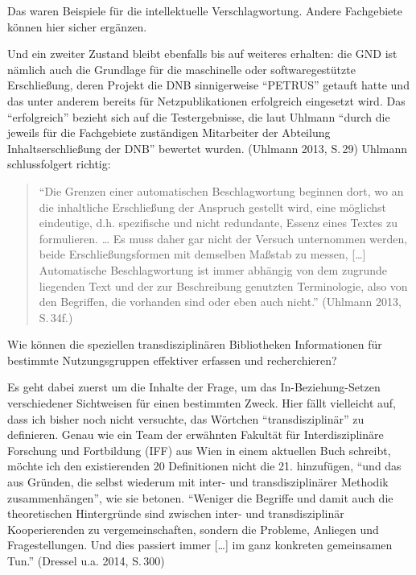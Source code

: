 Das waren Beispiele für die intellektuelle Verschlagwortung. Andere
Fachgebiete können hier sicher ergänzen.

Und ein zweiter Zustand bleibt ebenfalls bis auf weiteres erhalten: die
GND ist nämlich auch die Grundlage für die maschinelle oder
softwaregestützte Erschließung, deren Projekt die DNB sinnigerweise
\enquote{PETRUS} getauft hatte und das unter anderem bereits für
Netzpublikationen erfolgreich eingesetzt wird. Das \enquote{erfolgreich}
bezieht sich auf die Testergebnisse, die laut Uhlmann \enquote{durch die
jeweils für die Fachgebiete zuständigen Mitarbeiter der Abteilung
Inhaltserschließung der DNB} bewertet wurden. (Uhlmann 2013, S.\,29)
Uhlmann schlussfolgert richtig:

\begin{quote}
\enquote{Die Grenzen einer automatischen Beschlagwortung beginnen dort,
wo an die inhaltliche Erschließung der Anspruch gestellt wird, eine
möglichst eindeutige, d.h. spezifische und nicht redundante, Essenz
eines Textes zu formulieren. \ldots{} Es muss daher gar nicht der
Versuch unternommen werden, beide Erschließungsformen mit demselben
Maßstab zu messen, {[}\ldots{}{]} Automatische Beschlagwortung ist immer
abhängig von dem zugrunde liegenden Text und der zur Beschreibung
genutzten Terminologie, also von den Begriffen, die vorhanden sind oder
eben auch nicht.} (Uhlmann 2013, S.\,34f.)
\end{quote}

Wie können die speziellen transdisziplinären Bibliotheken Informationen
für bestimmte Nutzungsgruppen effektiver erfassen und recherchieren?

Es geht dabei zuerst um die Inhalte der Frage, um das
In-Beziehung-Setzen verschiedener Sichtweisen für einen bestimmten
Zweck. Hier fällt vielleicht auf, dass ich bisher noch nicht versuchte,
das Wörtchen \enquote{transdisziplinär} zu definieren. Genau wie ein
Team der erwähnten Fakultät für Interdisziplinäre Forschung und
Fortbildung (IFF) aus Wien in einem aktuellen Buch schreibt, möchte ich
den existierenden 20 Definitionen nicht die 21. hinzufügen, \enquote{und
das aus Gründen, die selbst wiederum mit inter- und transdisziplinärer
Methodik zusammenhängen}, wie sie betonen. \enquote{Weniger die Begriffe
und damit auch die theoretischen Hintergründe sind zwischen inter- und
transdisziplinär Kooperierenden zu vergemeinschaften, sondern die
Probleme, Anliegen und Fragestellungen. Und dies passiert immer
{[}\ldots{}{]} im ganz konkreten gemeinsamen Tun.} (Dressel u.a. 2014,
S.\,300)

